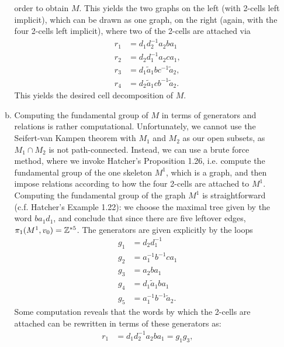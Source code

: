 \documentclass{../mathnotes}
\begin{document}
\begin{enumerate}
\begin{enumerate}[(a)]
                order to obtain $M$.
                This yields the two graphs on the left (with 2-cells left implicit), which can be
                drawn as one graph, on the right (again, with the four 2-cells left implicit),
                where two of the 2-cells are attached via 
                \begin{align*}
                    r_1&=d_1d_2^{-1}a_2ba_1\\
                    r_2&=d_2d_1^{-1}a_2ca_1,\\
                    r_3&=d_1\tilde a_1bc^{-1}\tilde a_2,\\
                    r_4&=d_2\tilde a_1cb^{-1}\tilde a_2.
                \end{align*}
                This yields the desired cell decomposition of $M$.
            \item Computing the fundamental group of $M$ in terms of generators and relations
                is rather computational. Unfortunately, we cannot use the Seifert-van Kampen theorem
                with $M_1$ and $M_2$ as our open subsets, as $M_1\cap M_2$ is not path-connected.
                Instead, we can use a brute force method, where we invoke Hatcher's Proposition 1.26,
                i.e. compute the fundamental group of the one skeleton $M^1$, which is a graph,
                and then impose relations according to how the four 2-cells are attached to $M^1$.
                Computing the fundamental group of the graph $M^1$ is straightforward (c.f. Hatcher's
                Example 1.22): we choose the maximal tree given by the word $ba_1d_1$, and conclude
                that since there are five leftover edges, $\pi_1(M^1,v_0)=\mathbb{Z}^{*5}$. The generators are
                given explicitly by the loops
                \begin{align*}
                    g_1 &= d_2d_1^{-1}\\
                    g_2 &= a_1^{-1}b^{-1}ca_1\\
                    g_3 &= a_2ba_1\\
                    g_4 &= d_1\tilde a_1ba_1\\
                    g_5 &= a_1^{-1}b^{-1}\tilde a_2.
                \end{align*}
                Some computation reveals that the words by which the 2-cells are attached can
                be rewritten in terms of these generators as:
                \begin{align*}
                    r_1 &= d_1d_2^{-1}a_2ba_1 = g_1g_3,\\

\end{align*}
\end{enumerate}
\end{enumerate}
\end{document}
